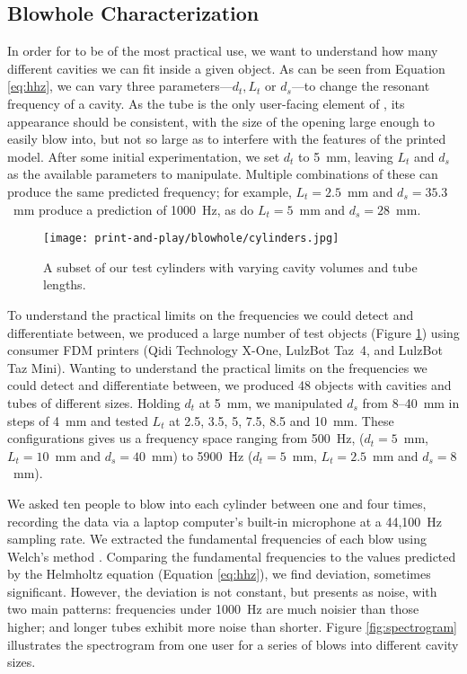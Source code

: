     \subsection{Blowhole Characterization} \label{sec:charac}
      In order for \bh to be of the most practical use, we want to understand
      how many different cavities we can fit inside a given object. As can be
      seen from Equation \ref{eq:hhz}, we can vary three parameters---$d_t, L_t$ or
      $d_s$---to change the resonant frequency of a \bh cavity. As the tube is
      the only user-facing element of \bh, its appearance should be consistent,
      with the size of the opening large enough to easily blow into, but not so
      large as to interfere with the features of the printed model. After some
      initial experimentation, we set $d_t$ to 5~mm, leaving $L_t$ and $d_s$ as
      the available parameters to manipulate. Multiple combinations of these can
      produce the same predicted frequency; for example, $L_t=2.5$~mm and
      $d_s=35.3$~mm produce a prediction of 1000~Hz, as do $L_t=5$~mm and
      $d_s=28$~mm.
      
      \begin{figure}
        \centering
        \texttt{[image: print-and-play/blowhole/cylinders.jpg]}
        \caption{A subset of our test cylinders with varying cavity volumes and
          tube lengths.}
        \label{fig:cylinders}
      \end{figure}
      
      To understand the practical limits on the frequencies we could detect and
      differentiate between, we produced a large number of test objects (Figure
      \ref{fig:cylinders}) using consumer FDM printers (Qidi Technology X-One,
      LulzBot Taz~4, and LulzBot Taz Mini). Wanting to understand the practical
      limits on the frequencies we could detect and differentiate between, we
      produced 48 objects with cavities and tubes of different sizes. Holding
      $d_t$ at 5~mm, we manipulated $d_s$ from 8--40~mm in steps of 4~mm and
      tested $L_t$ at 2.5, 3.5, 5, 7.5, 8.5 and 10~mm. These configurations
      gives us a frequency space ranging from 500~Hz, ($d_t=5$~mm, $L_t=10$~mm
      and $d_s=40$~mm) to 5900~Hz ($d_t=5$~mm, $L_t=2.5$~mm and $d_s=8$~mm).
          
      We asked ten people to blow into each cylinder between one and four times,
      recording the data via a laptop computer's built-in microphone at a
      44,100~Hz sampling rate. We extracted the fundamental frequencies of each
      blow using Welch's method \cite{Welch:1967jw}. Comparing the fundamental
      frequencies to the values predicted by the Helmholtz equation (Equation
      \ref{eq:hhz}), we find deviation, sometimes significant. However, the
      deviation is not constant, but presents as noise, with two main patterns:
      frequencies under 1000~Hz are much noisier than those higher; and longer
      tubes exhibit more noise than shorter. Figure \ref{fig:spectrogram}
      illustrates the spectrogram from one user for a series of blows into
      different cavity sizes.

